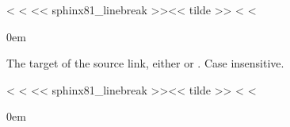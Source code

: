 \documentclass[letterpaper,10pt,english]{sphinxmanual}
\begin{document}
\begin{fulllineitems}
\label{\detokenize{confval:confval-source_link_target}}
<%
\pysigstartsignatures
<%
\pysigline<< sphinx81_linebreak >>{}<< tilde >>
<%
<%
\vspace{-30px}

\begin{DUlineblock}{0em}
\item[]  
\item[]  
\item[]  
\end{DUlineblock}

\vspace{-25px}

The target of the source link, either  or .
Case insensitive.

\end{fulllineitems}


\begin{fulllineitems}
\label{\detokenize{confval:confval-github_username}}
<%
\pysigstartsignatures
<%
\pysigline<< sphinx81_linebreak >>{}<< tilde >>
<%
<%
\vspace{-30px}

\begin{DUlineblock}{0em}
\item[]  
\item[]  
\end{DUlineblock}

\end{fulllineitems}
\end{document}

